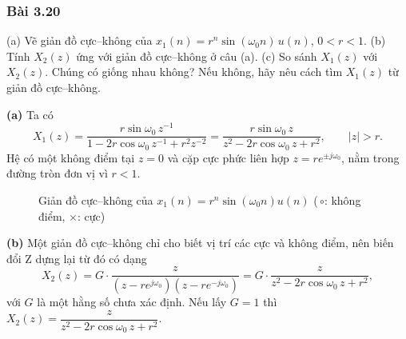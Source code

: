 \documentclass[12pt,a4paper]{article}
\begin{document}
\subsubsection*{Bài 3.20}
\begin{mdframed}[style=exbox]
(a) Vẽ giản đồ cực--không của $x_1(n) = r^n \sin(\omega_0 n)\, u(n)$, $0 < r < 1$.
(b) Tính $X_2(z)$ ứng với giản đồ cực--không ở câu (a).
(c) So sánh $X_1(z)$ với $X_2(z)$. Chúng có giống nhau không? Nếu không, hãy nêu cách tìm $X_1(z)$ từ giản đồ cực--không.
\end{mdframed}

\textbf{(a)} Ta có
\[
    X_1(z) = \frac{r\sin\omega_0\, z^{-1}}{1 - 2r\cos\omega_0\, z^{-1} + r^2 z^{-2}} = \frac{r\sin\omega_0\, z}{z^2 - 2r\cos\omega_0\, z + r^2}, \qquad |z| > r.
\]
Hệ có một không điểm tại $z = 0$ và cặp cực phức liên hợp $z = r e^{\pm j\omega_0}$, nằm trong đường tròn đơn vị vì $r < 1$.
\begin{figure}[H]
    \centering
    \caption{Giản đồ cực--không của $x_1(n) = r^n\sin(\omega_0 n)u(n)$ (\,$\circ$: không điểm, $\times$: cực)}
\end{figure}

\textbf{(b)} Một giản đồ cực--không chỉ cho biết vị trí các cực và không điểm, nên biến đổi Z dựng lại từ đó có dạng
\[
    X_2(z) = G\cdot\frac{z}{\left(z - re^{j\omega_0}\right)\left(z - re^{-j\omega_0}\right)} = G\cdot\frac{z}{z^2 - 2r\cos\omega_0\, z + r^2},
\]
với $G$ là một hằng số chưa xác định. Nếu lấy $G = 1$ thì $X_2(z) = \dfrac{z}{z^2 - 2r\cos\omega_0\, z + r^2}$.
\end{document}
